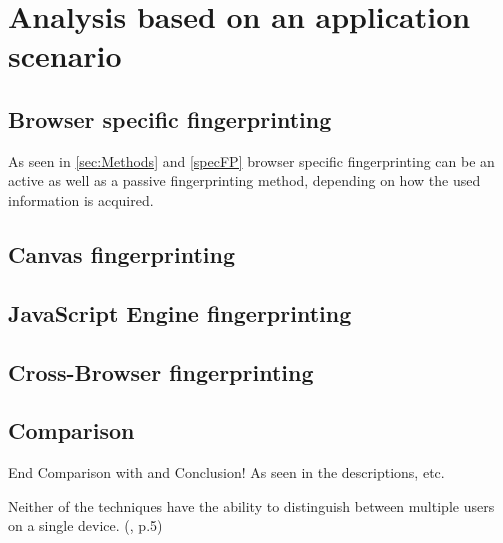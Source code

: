 \chapter{Analysis based on an application scenario}
\label{cha:ApplicationScenario}




\section{Browser specific fingerprinting}
As seen in \autoref{sec:Methods} and \autoref{specFP} browser specific fingerprinting can be an active as well as a passive fingerprinting method, depending on how the used information is acquired.


\section{Canvas fingerprinting}


\section{JavaScript Engine fingerprinting}

\section{Cross-Browser fingerprinting}

\section{Comparison}
End Comparison with and Conclusion!
As seen in the descriptions, etc.

Neither of the techniques have the ability to distinguish between multiple users on a single device.  (\textcite{upi15}, p.5)

